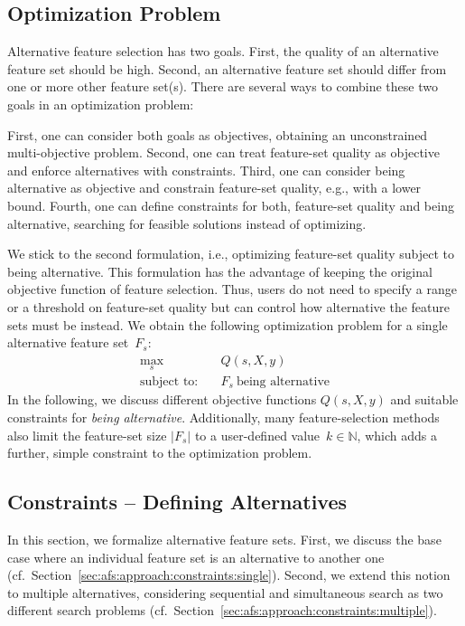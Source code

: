 \documentclass{article}
\theoremstyle{definition}
\begin{document}
\subsection{Optimization Problem}
\label{sec:afs:approach:problem}

Alternative feature selection has two goals.
First, the quality of an alternative feature set should be high.
Second, an alternative feature set should differ from one or more other feature set(s).
There are several ways to combine these two goals in an optimization problem:

First, one can consider both goals as objectives, obtaining an unconstrained multi-objective problem.
Second, one can treat feature-set quality as objective and enforce alternatives with constraints.
Third, one can consider being alternative as objective and constrain feature-set quality, e.g., with a lower bound.
Fourth, one can define constraints for both, feature-set quality and being alternative, searching for feasible solutions instead of optimizing.

We stick to the second formulation, i.e., optimizing feature-set quality subject to being alternative.
This formulation has the advantage of keeping the original objective function of feature selection.
Thus, users do not need to specify a range or a threshold on feature-set quality but can control how alternative the feature sets must be instead.
We obtain the following optimization problem for a single alternative feature set~$F_s$:
%
\begin{equation}
	\begin{aligned}
		\max_s &\quad Q(s,X,y) \\
		\text{subject to:} &\quad F_s~\text{being alternative}
	\end{aligned}
	\label{eq:afs:afs-general}
\end{equation}
%
In the following, we discuss different objective functions $Q(s,X,y)$ and suitable constraints for \emph{being alternative}.
Additionally, many feature-selection methods also limit the feature-set size $|F_s|$ to a user-defined value~$k \in \mathbb{N}$, which adds a further, simple constraint to the optimization problem.

\subsection{Constraints -- Defining Alternatives}
\label{sec:afs:approach:constraints}

In this section, we formalize alternative feature sets.
First, we discuss the base case where an individual feature set is an alternative to another one (cf.~Section~\ref{sec:afs:approach:constraints:single}).
Second, we extend this notion to multiple alternatives, considering sequential and simultaneous search as two different search problems (cf.~Section~\ref{sec:afs:approach:constraints:multiple}).
\end{document}
